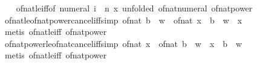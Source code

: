 \begin{isabellebody}
\ \ %
\endisadelimproof
%
\isatagproof
{}\isamarkupfalse%
\ of{\isacharunderscore}{\kern0pt}nat{\isacharunderscore}{\kern0pt}le{\isacharunderscore}{\kern0pt}iff{\isacharbrackleft}{\kern0pt}of\ {\isachardoublequoteopen}numeral\ i\ {\isacharcircum}{\kern0pt}\ n{\isachardoublequoteclose}\ x{\isacharcomma}{\kern0pt}\ unfolded\ of{\isacharunderscore}{\kern0pt}nat{\isacharunderscore}{\kern0pt}numeral\ of{\isacharunderscore}{\kern0pt}nat{\isacharunderscore}{\kern0pt}power{\isacharbrackright}{\kern0pt}\ \isacommand{{\isachardot}{\kern0pt}}\isamarkupfalse%
%
\endisatagproof
{\isafoldproof}%
%
\isadelimproof
\isanewline
%
\endisadelimproof
\isanewline
{}\isamarkupfalse%
\ of{\isacharunderscore}{\kern0pt}nat{\isacharunderscore}{\kern0pt}le{\isacharunderscore}{\kern0pt}of{\isacharunderscore}{\kern0pt}nat{\isacharunderscore}{\kern0pt}power{\isacharunderscore}{\kern0pt}cancel{\isacharunderscore}{\kern0pt}iff{\isacharbrackleft}{\kern0pt}simp{\isacharbrackright}{\kern0pt}{\isacharcolon}{\kern0pt}\ {\isachardoublequoteopen}{\isacharparenleft}{\kern0pt}of{\isacharunderscore}{\kern0pt}nat\ b{\isacharparenright}{\kern0pt}\ {\isacharcircum}{\kern0pt}\ w\ {\isasymle}\ of{\isacharunderscore}{\kern0pt}nat\ x\ {\isasymlongleftrightarrow}\ b\ {\isacharcircum}{\kern0pt}\ w\ {\isasymle}\ x{\isachardoublequoteclose}\isanewline
%
\isadelimproof
\ \ %
\endisadelimproof
%
\isatagproof
{}\isamarkupfalse%
\ {\isacharparenleft}{\kern0pt}metis\ of{\isacharunderscore}{\kern0pt}nat{\isacharunderscore}{\kern0pt}le{\isacharunderscore}{\kern0pt}iff\ of{\isacharunderscore}{\kern0pt}nat{\isacharunderscore}{\kern0pt}power{\isacharparenright}{\kern0pt}%
\endisatagproof
{\isafoldproof}%
%
\isadelimproof
\isanewline
%
\endisadelimproof
\isanewline
{}\isamarkupfalse%
\ of{\isacharunderscore}{\kern0pt}nat{\isacharunderscore}{\kern0pt}power{\isacharunderscore}{\kern0pt}le{\isacharunderscore}{\kern0pt}of{\isacharunderscore}{\kern0pt}nat{\isacharunderscore}{\kern0pt}cancel{\isacharunderscore}{\kern0pt}iff{\isacharbrackleft}{\kern0pt}simp{\isacharbrackright}{\kern0pt}{\isacharcolon}{\kern0pt}\ {\isachardoublequoteopen}of{\isacharunderscore}{\kern0pt}nat\ x\ {\isasymle}\ {\isacharparenleft}{\kern0pt}of{\isacharunderscore}{\kern0pt}nat\ b{\isacharparenright}{\kern0pt}\ {\isacharcircum}{\kern0pt}\ w\ {\isasymlongleftrightarrow}\ x\ {\isasymle}\ b\ {\isacharcircum}{\kern0pt}\ w{\isachardoublequoteclose}\isanewline
%
\isadelimproof
\ \ %
\endisadelimproof
%
\isatagproof
{}\isamarkupfalse%
\ {\isacharparenleft}{\kern0pt}metis\ of{\isacharunderscore}{\kern0pt}nat{\isacharunderscore}{\kern0pt}le{\isacharunderscore}{\kern0pt}iff\ of{\isacharunderscore}{\kern0pt}nat{\isacharunderscore}{\kern0pt}power{\isacharparenright}{\kern0pt}%

\end{isabellebody}
